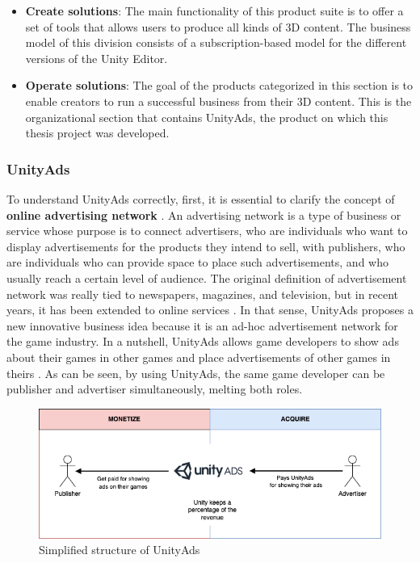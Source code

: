 \documentclass[english, 12pt, a4paper, sci, utf8, a-1b, online]{aaltothesis}
\begin{document}
\begin{itemize}
    \item \textbf{Create solutions}: The main functionality of this product suite is to offer a set of tools that allows users to produce all kinds of 3D content. The business model of this division consists of a subscription-based model for the different versions of the Unity Editor.
    \item \textbf{Operate solutions}: The goal of the products categorized in this section is to enable creators to run a successful business from their 3D content. This is the organizational section that contains UnityAds, the product on which this thesis project was developed.
\end{itemize}

\subsubsection{UnityAds}

To understand UnityAds correctly, first, it is essential to clarify the concept of \textbf{online advertising network} \cite{goldfarb2011online} \cite{schmeiser2016online}. An advertising network is a type of business or service whose purpose is to connect advertisers, who are individuals who want to display advertisements for the products they intend to sell, with publishers, who are individuals who can provide space to place such advertisements, and who usually reach a certain level of audience. The original definition of advertisement network was really tied to newspapers, magazines, and television, but in recent years, it has been extended to online services \cite{ha2008online}. In that sense, UnityAds proposes a new innovative business idea because it is an ad-hoc advertisement network for the game industry. In a nutshell, UnityAds allows game developers to show ads about their games in other games and place advertisements of other games in theirs \cite{chu2013iad}. As can be seen, by using UnityAds, the same game developer can be publisher and advertiser simultaneously, melting both roles.\\

\begin{figure}[h]
    \centering
    \includegraphics[scale=0.4]{src/thesis/img/background/unity-ads.png}
    \caption{Simplified structure of UnityAds}
    \label{fig:background:unity-ads}
\end{figure}
\end{document}
